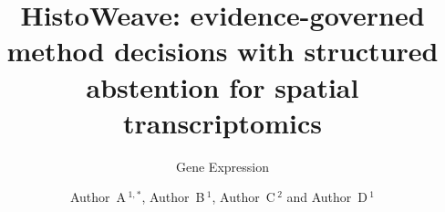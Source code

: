 \documentclass[]{bioinfo}
\begin{document}

\subtitle{Gene Expression}

\title[HistoWeave]{HistoWeave: evidence-governed method decisions with structured
abstention for spatial transcriptomics}

\author[Author~A \textit{et~al}.]{
Author~A\,$^{1,*}$,
Author~B\,$^{1}$,
Author~C\,$^{2}$
and Author~D\,$^{1}$
}

\address{
$^{1}$Department of XXX, University of XXX, City, Country \\
$^{2}$Department of XXX, University of XXX, City, Country
}



\end{document}

